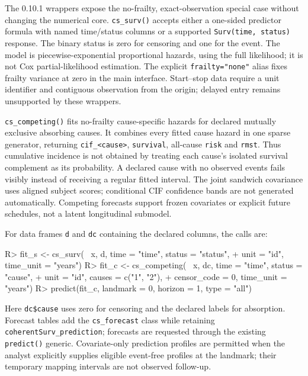 \documentclass[article,nojss]{jss}
\newcommand{\code}[1]{\texttt{#1}}
\newenvironment{CodeChunk}{}{}
\begin{document}
The 0.10.1 wrappers expose the no-frailty, exact-observation special case without changing the numerical core. \code{cs\_surv()} accepts either a one-sided predictor formula with named time/status columns or a supported \code{Surv(time, status)} response. The binary status is zero for censoring and one for the event. The model is piecewise-exponential proportional hazards, using the full likelihood; it is not Cox partial-likelihood estimation. The explicit \code{frailty="none"} alias fixes frailty variance at zero in the main interface. Start--stop data require a unit identifier and contiguous observation from the origin; delayed entry remains unsupported by these wrappers.

\code{cs\_competing()} fits no-frailty cause-specific hazards for declared mutually exclusive absorbing causes. It combines every fitted cause hazard in one sparse generator, returning \code{cif\_<cause>}, \code{survival}, all-cause \code{risk} and \code{rmst}. Thus cumulative incidence is not obtained by treating each cause's isolated survival complement as its probability. A declared cause with no observed events fails visibly instead of receiving a regular fitted interval. The joint sandwich covariance uses aligned subject scores; conditional CIF confidence bands are not generated automatically. Competing forecasts support frozen covariates or explicit future schedules, not a latent longitudinal submodel.

For data frames \code{d} and \code{dc} containing the declared columns, the calls are:
\begin{CodeChunk}
\begin{CodeInput}
R> fit_s <- cs_surv(~ x, d, time = "time", status = "status",
+                  unit = "id", time_unit = "years")
R> fit_c <- cs_competing(~ x, dc, time = "time", status = "cause",
+                       unit = "id", causes = c("1", "2"),
+                       censor_code = 0, time_unit = "years")
R> predict(fit_c, landmark = 0, horizon = 1, type = "all")
\end{CodeInput}
\end{CodeChunk}
Here \code{dc\$cause} uses zero for censoring and the declared labels for absorption. Forecast tables add the \code{cs\_forecast} class while retaining \code{coherentSurv\_prediction}; forecasts are requested through the existing \code{predict()} generic. Covariate-only prediction profiles are permitted when the analyst explicitly supplies eligible event-free profiles at the landmark; their temporary mapping intervals are not observed follow-up.
\end{document}
